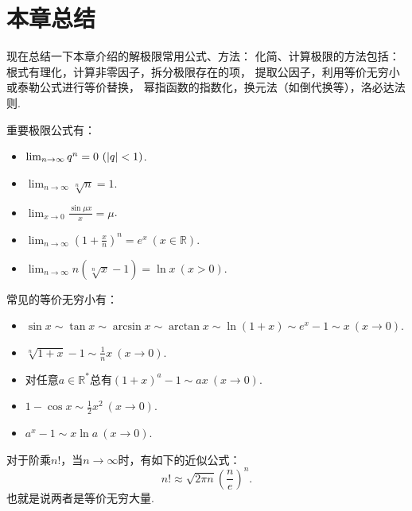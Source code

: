 \section{本章总结}
现在总结一下本章介绍的解极限常用公式、方法：
化简、计算极限的方法包括：
根式有理化，计算非零因子，拆分极限存在的项，
提取公因子，利用等价无穷小或泰勒公式进行等价替换，
幂指函数的指数化，换元法（如倒代换等），洛必达法则.

重要极限公式有：
\begin{itemize}
	\item \(\lim_{n\to\infty} q^n=0\ (\abs{q}<1)\).
	\item \(\lim_{n\to\infty} \sqrt[n]{n}=1\).
	\item \(\lim_{x\to0} \frac{\sin \mu x}{x}=\mu\).
	\item \(\lim_{n\to\infty} \left(1+\frac{x}{n}\right)^n=e^x\ (x\in\mathbb{R})\).
	\item \(\lim_{n\to\infty} n\left(\sqrt[n]{x}-1\right)=\ln x\ (x>0)\).
\end{itemize}

常见的等价无穷小有：
\begin{itemize}
	\item \(\sin x
		\sim \tan x
		\sim \arcsin x
		\sim \arctan x
		\sim \ln(1+x)
		\sim e^x-1
		\sim x\ (x\to0)\).
	\item \(\sqrt[n]{1+x} - 1 \sim \frac{1}{n} x\ (x\to0)\).
	\item 对任意\(a\in\mathbb{R}^*\)总有\((1+x)^a-1 \sim ax\ (x\to0)\).
	\item \(1 - \cos x \sim \frac{1}{2} x^2\ (x\to0)\).
	\item \(a^x - 1 \sim x \ln a\ (x\to0)\).
\end{itemize}

\begin{theorem}[斯特林公式]\label{theorem:极限.斯特林公式}
对于阶乘\(n!\)，当\(n\to\infty\)时，有如下的近似公式：\[
n! \approx \sqrt{2 \pi n} \left( \frac{n}{e} \right)^n.
\]也就是说两者是等价无穷大量.
\end{theorem}
